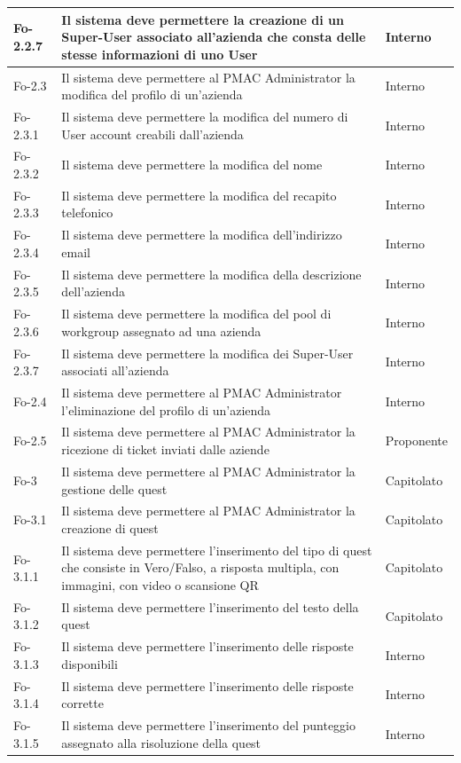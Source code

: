 \documentclass[10pt,a4paper]{article}
\begin{document}
\begin{longtable}{|p{}|p{}|p{}|}
\hline
Fo-2.2.7 & Il sistema deve permettere la creazione di un Super-User associato all'azienda che consta delle stesse informazioni di uno User & Interno\\
\hline
Fo-2.3 & Il sistema deve permettere al PMAC Administrator la modifica del profilo di un'azienda & Interno\\
\hline
Fo-2.3.1 & Il sistema deve permettere la modifica del numero di User account creabili dall'azienda & Interno\\
\hline
Fo-2.3.2 & Il sistema deve permettere la modifica del nome & Interno\\
\hline
Fo-2.3.3 & Il sistema deve permettere la modifica del recapito telefonico & Interno\\
\hline
Fo-2.3.4 & Il sistema deve permettere la modifica dell'indirizzo email & Interno\\
\hline
Fo-2.3.5 & Il sistema deve permettere la modifica della descrizione dell'azienda & Interno\\
\hline
Fo-2.3.6 & Il sistema deve permettere la modifica del pool di workgroup assegnato ad una azienda & Interno\\
\hline
Fo-2.3.7 & Il sistema deve permettere la modifica dei Super-User associati all'azienda & Interno\\
\hline
Fo-2.4 & Il sistema deve permettere al PMAC Administrator l'eliminazione del profilo di un'azienda & Interno\\
\hline
Fo-2.5 & Il sistema deve permettere al PMAC Administrator la ricezione di ticket inviati dalle aziende & Proponente\\
\hline
Fo-3 & Il sistema deve permettere al PMAC Administrator la gestione delle quest & Capitolato\\
\hline
Fo-3.1 & Il sistema deve permettere al PMAC Administrator la creazione di quest & Capitolato\\
\hline
Fo-3.1.1 & Il sistema deve permettere l'inserimento del tipo di quest che consiste in Vero/Falso, a risposta multipla, con immagini, con video o scansione QR & Capitolato\\
\hline
Fo-3.1.2 & Il sistema deve permettere l'inserimento del testo della quest & Capitolato\\
\hline
Fo-3.1.3 & Il sistema deve permettere l'inserimento delle risposte disponibili & Interno\\
\hline
Fo-3.1.4 & Il sistema deve permettere l'inserimento delle risposte corrette & Interno\\
\hline
Fo-3.1.5 & Il sistema deve permettere l'inserimento del punteggio assegnato alla risoluzione della quest & Interno\\

\end{longtable}
\end{document}
